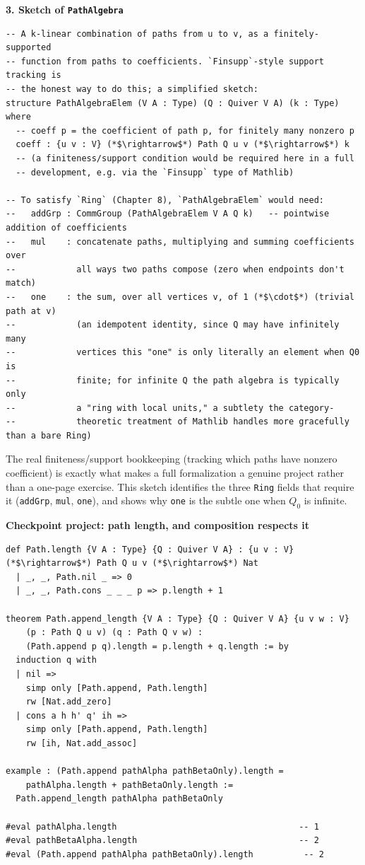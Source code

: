 \textbf{3. Sketch of \texttt{PathAlgebra}}

\begin{lstlisting}
-- A k-linear combination of paths from u to v, as a finitely-supported
-- function from paths to coefficients. `Finsupp`-style support tracking is
-- the honest way to do this; a simplified sketch:
structure PathAlgebraElem (V A : Type) (Q : Quiver V A) (k : Type) where
  -- coeff p = the coefficient of path p, for finitely many nonzero p
  coeff : {u v : V} (*$\rightarrow$*) Path Q u v (*$\rightarrow$*) k
  -- (a finiteness/support condition would be required here in a full
  -- development, e.g. via the `Finsupp` type of Mathlib)

-- To satisfy `Ring` (Chapter 8), `PathAlgebraElem` would need:
--   addGrp : CommGroup (PathAlgebraElem V A Q k)   -- pointwise addition of coefficients
--   mul    : concatenate paths, multiplying and summing coefficients over
--            all ways two paths compose (zero when endpoints don't match)
--   one    : the sum, over all vertices v, of 1 (*$\cdot$*) (trivial path at v)
--            (an idempotent identity, since Q may have infinitely many
--            vertices this "one" is only literally an element when Q0 is
--            finite; for infinite Q the path algebra is typically only
--            a "ring with local units," a subtlety the category-
--            theoretic treatment of Mathlib handles more gracefully than a bare Ring)
\end{lstlisting}

The real finiteness/support bookkeeping (tracking which paths have nonzero coefficient) is exactly what makes a full formalization a genuine project rather than a one-page exercise. This sketch identifies the three \texttt{Ring} fields that require it (\texttt{addGrp}, \texttt{mul}, \texttt{one}), and shows why \texttt{one} is the subtle one when \(Q_0\) is infinite.

\textbf{Checkpoint project: path length, and composition respects it}

\begin{lstlisting}
def Path.length {V A : Type} {Q : Quiver V A} : {u v : V} (*$\rightarrow$*) Path Q u v (*$\rightarrow$*) Nat
  | _, _, Path.nil _ => 0
  | _, _, Path.cons _ _ _ p => p.length + 1

theorem Path.append_length {V A : Type} {Q : Quiver V A} {u v w : V}
    (p : Path Q u v) (q : Path Q v w) :
    (Path.append p q).length = p.length + q.length := by
  induction q with
  | nil =>
    simp only [Path.append, Path.length]
    rw [Nat.add_zero]
  | cons a h h' q' ih =>
    simp only [Path.append, Path.length]
    rw [ih, Nat.add_assoc]

example : (Path.append pathAlpha pathBetaOnly).length =
    pathAlpha.length + pathBetaOnly.length :=
  Path.append_length pathAlpha pathBetaOnly

#eval pathAlpha.length                                    -- 1
#eval pathBetaAlpha.length                                -- 2
#eval (Path.append pathAlpha pathBetaOnly).length          -- 2
\end{lstlisting}

